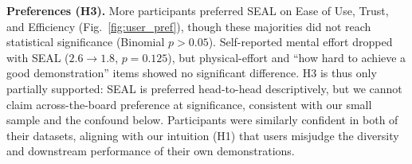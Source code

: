 \textbf{Preferences (H3).} More participants preferred SEAL on Ease of Use, Trust, and Efficiency (Fig.~\ref{fig:user_pref}), though these majorities did not reach statistical significance (Binomial $p > 0.05$). Self-reported mental effort dropped with SEAL ($2.6\!\to\!1.8$, $p=0.125$), but physical-effort and ``how hard to achieve a good demonstration'' items showed no significant difference. H3 is thus only partially supported: SEAL is preferred head-to-head descriptively, but we cannot claim across-the-board preference at significance, consistent with our small sample and the confound below. Participants were similarly confident in both of their datasets, aligning with our intuition (H1) that users misjudge the diversity and downstream performance of their own demonstrations.

